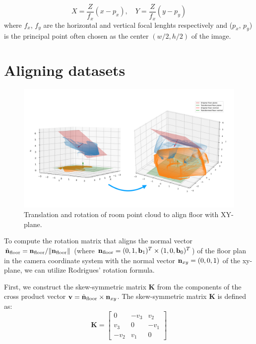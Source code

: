 \begin{equation}
    X = \frac{Z}{f_x} \left( x - p_x \right) , \quad Y = \frac{Z}{f_x} \left(y - p_y \right)
\end{equation}
where $f_x$, $f_y$ are the horizontal and vertical focal lenghts respectively and ($p_x$, $p_y$) is the principal point often chosen as the center $(w/2,h/2)$ of the image. 

\section{Aligning datasets}
\begin{figure}
    \centering
    \includegraphics[width=\linewidth]{figures/rotation.pdf}
    \caption{Translation and rotation of room point cloud to align floor with XY-plane.}
    \label{fig:rotate-floor-planes}
\end{figure}

To compute the rotation matrix that aligns the normal vector $\hat{\boldsymbol{\mathbf{n}}}_\text{floor} = \boldsymbol{\mathbf{n}}_\text{floor} / \| \boldsymbol{\mathbf{n}}_\text{floor} \|$ (where $\boldsymbol{\mathbf{n}}_\text{floor} = (0, 1, \boldsymbol{\mathbf{b}}_1)^T \times (1, 0, \boldsymbol{\mathbf{b}}_0)^T$) of the floor plan in the camera coordinate system with the normal vector $\boldsymbol{\mathbf{n}}_{xy} = (0, 0, 1)$ of the xy-plane, we can utilize Rodrigues' rotation formula. 

First, we construct the skew-symmetric matrix $\mathbf{K}$ from the components of the cross product vector $\boldsymbol{\mathbf{v}} = \hat{\boldsymbol{\mathbf{n}}}_\text{floor} \times \boldsymbol{\mathbf{n}}_{xy}$. The skew-symmetric matrix $\mathbf{K}$ is defined as:
\begin{equation}
    \mathbf{K} = \begin{bmatrix}
        0 & -v_3 & v_2 \\
        v_3 & 0 & -v_1 \\
        -v_2 & v_1 & 0
    \end{bmatrix}
\end{equation}

